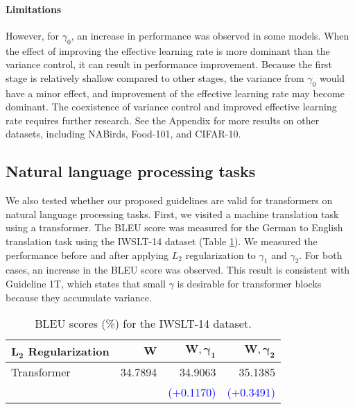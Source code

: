 \documentclass{article}
\begin{document}
\paragraph{Limitations} However, for $\gamma_0$, an increase in performance was observed in some models. When the effect of improving the effective learning rate is more dominant than the variance control, it can result in performance improvement. Because the first stage is relatively shallow compared to other stages, the variance from $\gamma_0$ would have a minor effect, and improvement of the effective learning rate may become dominant. The coexistence of variance control and improved effective learning rate requires further research. See the Appendix for more results on other datasets, including NABirds, Food-101, and CIFAR-10.

\subsection{Natural language processing tasks}
We also tested whether our proposed guidelines are valid for transformers on natural language processing tasks. First, we visited a machine translation task using a transformer. The BLEU score \cite{acl/PapineniRWZ02} was measured for the German to English translation task using the IWSLT-14 dataset \cite{cettolo2014report} (Table \ref{tab:iwslt}). We measured the performance before and after applying $L_2$ regularization to $\gamma_1$ and $\gamma_2$. For both cases, an increase in the BLEU score was observed. This result is consistent with Guideline 1T, which states that small $\gamma$ is desirable for transformer blocks because they accumulate variance.

\begin{table}[h]
	\caption{BLEU scores (\%) for the IWSLT-14 dataset.}
	\label{tab:iwslt}
	\centering
	\begin{tabular}{l|r|r|r}
		\toprule
		$\pmb{L_2}$ \textbf{Regularization} & $\pmb{W}$ & $\pmb{W,\gamma_1}$          & $\pmb{W,\gamma_2}$          \\
		\midrule
		Transformer                         & 34.7894   & 34.9063                     & 35.1385                     \\
		                                    &           & \textcolor{blue}{(+0.1170)} & \textcolor{blue}{(+0.3491)} \\
		\bottomrule
	\end{tabular}
\end{table}
\end{document}
